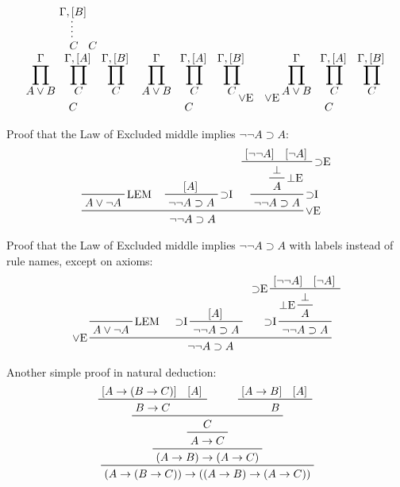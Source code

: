 \documentclass{amsart}
\begin{document}
\begin{displaymath}
\begin{array}{@{}ccc@{}}
{      {\prfsummary{\Gamma, \prfboundedassumption{B}}{C}}
      {C}} \\
    {\prfsummarystyle=1
      \prftree[noline]{\prfsummary{\Gamma}{A \vee B}}
      {\prfsummary{\Gamma, \prfboundedassumption{A}}{C}}
      {\prfsummary{\Gamma, \prfboundedassumption{B}}{C}}
      {C}} &
    {\prfsummarystyle=1
      \prftree[noline][r]{$\vee$E}{\prfsummary{\Gamma}{A \vee B}}
      {\prfsummary{\Gamma, \prfboundedassumption{A}}{C}}
      {\prfsummary{\Gamma, \prfboundedassumption{B}}{C}}
      {C}} &
    {\prfsummarystyle=1
      \prftree[noline][l]{$\vee$E}{\prfsummary{\Gamma}{A \vee B}}
      {\prfsummary{\Gamma, \prfboundedassumption{A}}{C}}
      {\prfsummary{\Gamma, \prfboundedassumption{B}}{C}}
      {C}}
  \end{array}
\end{displaymath}

Proof that the Law of Excluded middle implies $\neg\neg A \supset A$:
\begin{displaymath}
  \prftree[r]{$\vee$E}
  {\prfbyaxiom{LEM}
    {A \vee \neg A}\hspace{.4em}}
  {\prftree[r]{$\supset$I}
    {\prfboundedassumption{A}}
    {\neg\neg A \supset A}}
  {\prftree[r]{$\supset$I}
    {\prftree[r]{$\bot$E}
      {\prftree[r]{$\supset$E}
        {\prfboundedassumption{\neg\neg A}}
        {\prfboundedassumption{\neg A}}
        {\bot}}
      {A}}
    {\neg\neg A \supset A}}
  {\neg\neg A \supset A}
\end{displaymath}

Proof that the Law of Excluded middle implies $\neg\neg A \supset A$
with labels instead of rule names, except on axioms:
\begin{displaymath}
  \prftree[l]{$\vee$E}
  {\prfbyaxiom{LEM}
    {A \vee \neg A}\hspace{.6em}}
  {\prftree[l]{$\supset$I}
    {\prfboundedassumption{A}}
    {\neg\neg A \supset A}}
  {\prftree[l]{$\supset$I}
    {\prftree[l]{$\bot$E}
      {\prftree[l]{$\supset$E}
        {\prfboundedassumption{\neg\neg A}}
        {\prfboundedassumption{\neg A}}
        {\bot}}
      {A}}
    {\neg\neg A \supset A}}
  {\neg\neg A \supset A}
\end{displaymath}

Another simple proof in natural deduction:
\begin{displaymath}
  \prftree
  {\prftree
    {\prftree
      {\prftree
        {\prftree
          {\prfboundedassumption{A \rightarrow (B \rightarrow C)}}
          {\prfboundedassumption{A}}
          {B \rightarrow C}\hspace{2em}}
        {\prftree
          {\prfboundedassumption{A \rightarrow B}}
          {\prfboundedassumption{A}}
          {B}}
        {C}}
      {A \rightarrow C}}
    {(A \rightarrow B) \rightarrow (A \rightarrow C)}}
  {(A \rightarrow (B \rightarrow C)) \rightarrow ((A \rightarrow B) 
    \rightarrow (A \rightarrow C))} 
\end{displaymath}
\end{document}
